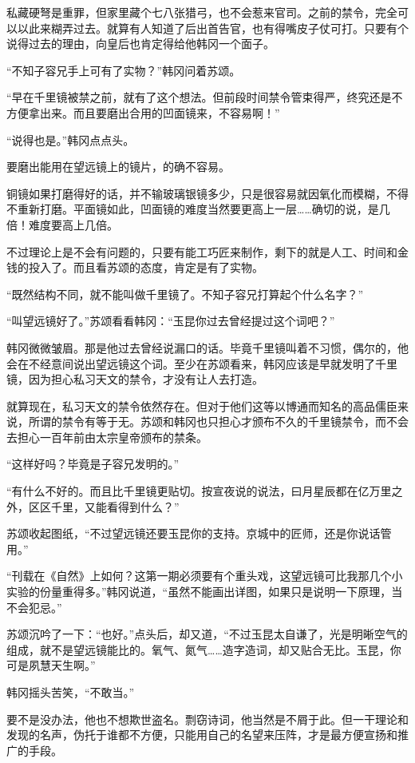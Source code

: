 私藏硬弩是重罪，但家里藏个七八张猎弓，也不会惹来官司。之前的禁令，完全可以以此来糊弄过去。就算有人知道了后出首告官，也有得嘴皮子仗可打。只要有个说得过去的理由，向皇后也肯定得给他韩冈一个面子。

“不知子容兄手上可有了实物？”韩冈问着苏颂。

“早在千里镜被禁之前，就有了这个想法。但前段时间禁令管束得严，终究还是不方便拿出来。而且要磨出合用的凹面镜来，不容易啊！”

“说得也是。”韩冈点点头。

要磨出能用在望远镜上的镜片，的确不容易。

铜镜如果打磨得好的话，并不输玻璃银镜多少，只是很容易就因氧化而模糊，不得不重新打磨。平面镜如此，凹面镜的难度当然要更高上一层……确切的说，是几倍！难度要高上几倍。

不过理论上是不会有问题的，只要有能工巧匠来制作，剩下的就是人工、时间和金钱的投入了。而且看苏颂的态度，肯定是有了实物。

“既然结构不同，就不能叫做千里镜了。不知子容兄打算起个什么名字？”

“叫望远镜好了。”苏颂看看韩冈：“玉昆你过去曾经提过这个词吧？”

韩冈微微皱眉。那是他过去曾经说漏口的话。毕竟千里镜叫着不习惯，偶尔的，他会在不经意间说出望远镜这个词。至少在苏颂看来，韩冈应该是早就发明了千里镜，因为担心私习天文的禁令，才没有让人去打造。

就算现在，私习天文的禁令依然存在。但对于他们这等以博通而知名的高品儒臣来说，所谓的禁令有等于无。苏颂和韩冈也只担心才颁布不久的千里镜禁令，而不会去担心一百年前由太宗皇帝颁布的禁条。

“这样好吗？毕竟是子容兄发明的。”

“有什么不好的。而且比千里镜更贴切。按宣夜说的说法，曰月星辰都在亿万里之外，区区千里，又能看得到什么？”

苏颂收起图纸，“不过望远镜还要玉昆你的支持。京城中的匠师，还是你说话管用。”

“刊载在《自然》上如何？这第一期必须要有个重头戏，这望远镜可比我那几个小实验的份量重得多。”韩冈说道，“虽然不能画出详图，如果只是说明一下原理，当不会犯忌。”

苏颂沉吟了一下：“也好。”点头后，却又道，“不过玉昆太自谦了，光是明晰空气的组成，就不是望远镜能比的。氧气、氮气……造字造词，却又贴合无比。玉昆，你可是夙慧天生啊。”

韩冈摇头苦笑，“不敢当。”

要不是没办法，他也不想欺世盗名。剽窃诗词，他当然是不屑于此。但一干理论和发现的名声，伪托于谁都不方便，只能用自己的名望来压阵，才是最方便宣扬和推广的手段。

